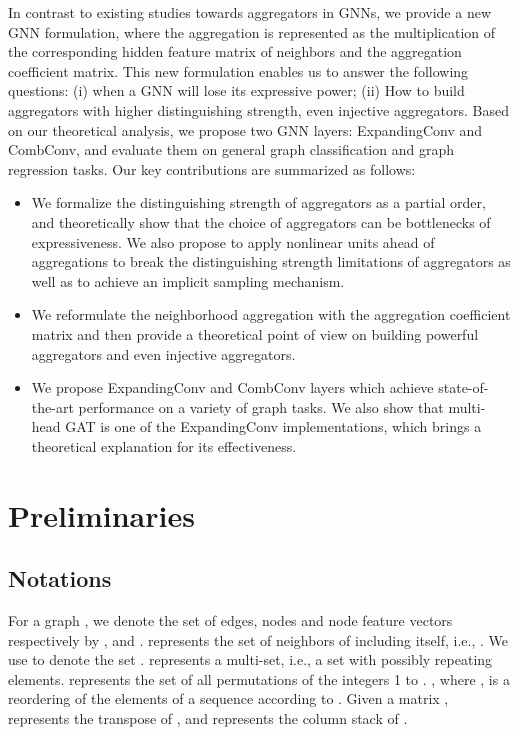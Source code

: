 \documentclass{article} \usepackage{iclr2021_conference,times}
\begin{document}
In contrast to existing studies towards aggregators in GNNs,
we provide a new GNN formulation,
where the aggregation is represented as the multiplication of the corresponding hidden feature matrix of neighbors and the aggregation coefficient matrix.
This new formulation enables us to answer the following questions:
(i) when a GNN will lose its expressive power;
(ii) How to build aggregators with higher distinguishing strength, even injective aggregators.
Based on our theoretical analysis,
we propose two GNN layers: ExpandingConv and CombConv,
and evaluate them on general graph classification and graph regression tasks.
Our key contributions are summarized as follows:
\begin{itemize}
\item We formalize the distinguishing strength of aggregators as a partial order,
and theoretically show that the choice of aggregators can be bottlenecks of expressiveness.
We also propose to apply nonlinear units ahead of aggregations to break the distinguishing strength limitations of aggregators as well as to achieve an implicit sampling mechanism.
\item We reformulate the neighborhood aggregation with the aggregation coefficient matrix and then provide a theoretical point of view on building powerful aggregators and even injective aggregators.
\item We propose ExpandingConv and CombConv layers
which achieve state-of-the-art performance on a variety of graph tasks.
We also show that multi-head GAT is one of the ExpandingConv implementations,
which brings a theoretical explanation for its effectiveness.
\end{itemize}

\section{Preliminaries}

\subsection{Notations}

For a graph ,
we denote the set of edges, nodes and node feature vectors respectively by ,  and .
 represents the set of neighbors of  including itself, i.e., .
We use  to denote the set .
 represents a multi-set, i.e., a set with possibly repeating elements.
 represents the set of all permutations of the integers 1 to .
, where , is a reordering of the elements of a sequence  according to .
Given a matrix ,
 represents the transpose of ,
and  represents the column stack of .
\end{document}
